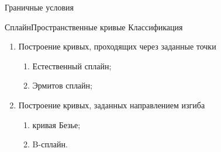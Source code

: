 \documentclass{beamer}
\begin{document}
\begin{frame}{Граничные условия}
{		}

	\end{frame}

	\begin{frame}{Сплайн}{Пространственные кривые}
		Классификация
		\begin{enumerate}
			\item Построение кривых, проходящих через заданные точки
			\begin{enumerate}
				\item Естественный сплайн;
				\item Эрмитов сплайн;
			\end{enumerate}
			\item Построение кривых, заданных направлением изгиба
			\begin{enumerate}
				\item кривая Безье;
				\item B-сплайн.
			\end{enumerate}
		\end{enumerate}


	\end{frame}
\end{document}
